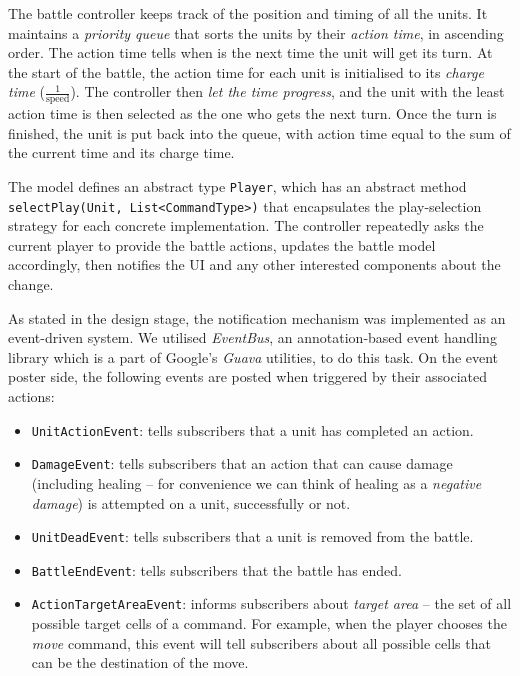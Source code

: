 The battle controller keeps track of the position and timing of all the units. It maintains a \textit{priority queue} that sorts the units by their \textit{action time}, in ascending order. The action time tells when is the next time the unit will get its turn. At the start of the battle, the action time for each unit is initialised to its \textit{charge time} ($\frac{1}{\text{speed}}$). The controller then \textit{let the time progress}, and the unit with the least action time is then selected as the one who gets the next turn. Once the turn is finished, the unit is put back into the queue, with action time equal to the sum of the current time and its charge time.

The model defines an abstract type \texttt{Player}, which has an abstract method \texttt{selectPlay(Unit, List<CommandType>)} that encapsulates the play-selection strategy for each concrete implementation. The controller repeatedly asks the current player to provide the battle actions, updates the battle model accordingly, then notifies the UI and any other interested components about the change.

As stated in the design stage, the notification mechanism was implemented as an event-driven system. We utilised \textit{EventBus}, an annotation-based event handling library which is a part of Google's \textit{Guava} utilities, to do this task. On the event poster side, the following events are posted when triggered by their associated actions:
\begin{itemize}
	\item \texttt{UnitActionEvent}: tells subscribers that a unit has completed an action.
	\item \texttt{DamageEvent}: tells subscribers that an action that can cause damage (including healing -- for convenience we can think of healing as a \textit{negative damage}) is attempted on a unit, successfully or not.
	\item \texttt{UnitDeadEvent}: tells subscribers that a unit is removed from the battle.
	\item \texttt{BattleEndEvent}: tells subscribers that the battle has ended.
	\item \texttt{ActionTargetAreaEvent}: informs subscribers about \textit{target area} -- the set of all possible target cells of a command. For example, when the player chooses the \textit{move} command, this event will tell subscribers about all possible cells that can be the destination of the move.
\end{itemize}

